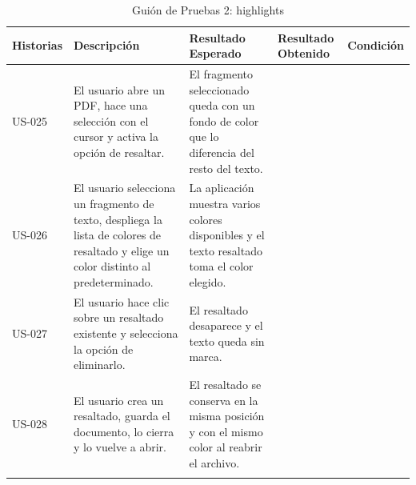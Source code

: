 \begin{longtable}{ | p{2cm} | p{3cm} | p{4cm} | p{4cm} | c |}
      \hline
      \textbf{Historias} & \textbf{Descripción} & \textbf{Resultado Esperado} & \textbf{Resultado Obtenido} & \textbf{Condición}\\
      \hline
      US-025 &
      El usuario abre un PDF, hace una selección con el cursor y activa la opción de resaltar. &
      El fragmento seleccionado queda con un fondo de color que lo diferencia del resto del texto. &
       &
      \\
      \hline
      US-026 &
      El usuario selecciona un fragmento de texto, despliega la lista de colores de resaltado y elige un color distinto al predeterminado. &
      La aplicación muestra varios colores disponibles y el texto resaltado toma el color elegido. &
       &
      \\
      \hline
      US-027 &
      El usuario hace clic sobre un resaltado existente y selecciona la opción de eliminarlo. &
      El resaltado desaparece y el texto queda sin marca. &
       &
      \\
      \hline
      US-028 &
      El usuario crea un resaltado, guarda el documento, lo cierra y lo vuelve a abrir. &
      El resaltado se conserva en la misma posición y con el mismo color al reabrir el archivo. &
       &
      \\
      \hline
 
      \caption{Guión de Pruebas 2: highlights}
      \label{TestScript2}
\end{longtable}
 
